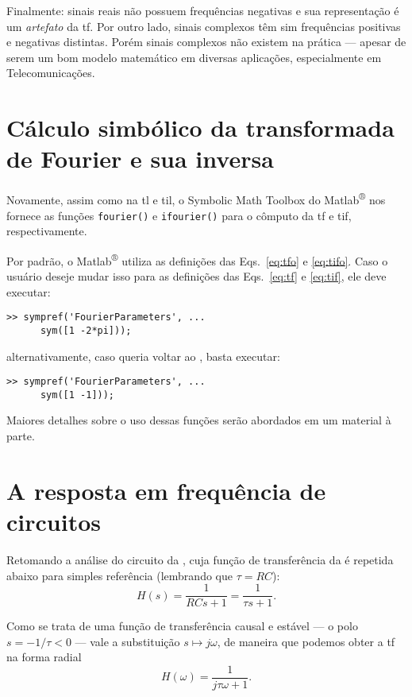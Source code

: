 Finalmente: sinais reais não possuem frequências negativas e sua representação é um \emph{artefato} da \ac{tf}. Por outro lado, sinais complexos têm sim frequências positivas e negativas distintas. Porém sinais complexos não existem na prática --- apesar de serem um bom modelo matemático em diversas aplicações, especialmente em Telecomunicações.

\section{Cálculo simbólico da transformada de Fourier e sua inversa}

Novamente, assim como na \ac{tl} e \ac{til}, o Symbolic Math Toolbox do Matlab\textsuperscript{®} nos fornece as funções \lstinline{fourier()} e \lstinline{ifourier()} para o cômputo da \ac{tf} e \ac{tif}, respectivamente.

Por padrão, o Matlab\textsuperscript{®} utiliza as definições das Eqs.~\eqref{eq:tfo} e \eqref{eq:tifo}. Caso o usuário deseje mudar isso para as definições das Eqs.~\eqref{eq:tf} e \eqref{eq:tif}, ele deve executar:
\begin{lstlisting}
>> sympref('FourierParameters', ...
      sym([1 -2*pi]));
\end{lstlisting}
alternativamente, caso queria voltar ao , basta executar:
\begin{lstlisting}
>> sympref('FourierParameters', ...
      sym([1 -1]));
\end{lstlisting}

Maiores detalhes sobre o uso dessas funções serão abordados em um material à parte.

\section{A resposta em frequência de circuitos}

Retomando a análise do circuito da , cuja função de transferência da  é repetida abaixo para simples referência (lembrando que $\tau=RC$):
\begin{equation*}
	H(s)=\frac{1}{RCs+1}=\frac{1}{\tau s+1}.
\end{equation*}

Como se trata de uma função de transferência causal e estável --- o polo $s=-1\slash\tau<0$ --- vale a substituição $s\mapsto j\omega$, de maneira que podemos obter a \ac{tf} na forma radial
\begin{equation}
	H(\omega)=\frac{1}{j\tau\omega+1}.
\end{equation}

